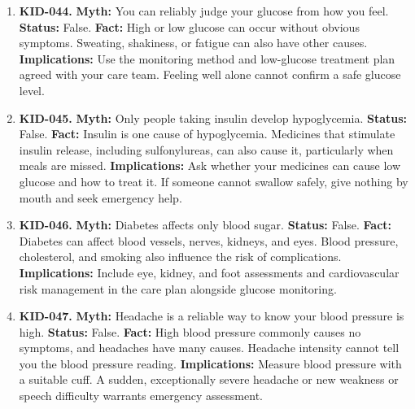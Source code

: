 \documentclass[11pt,oneside]{book}
\begin{document}
\begin{enumerate}[leftmargin=0pt,labelwidth=0pt,labelsep=0pt,itemindent=0pt]
\textbf{Implications:} Discuss medication changes with your clinician. Continued glucose and complication monitoring is recommended even in remission.
\item[] \textbf{KID-044.} \textbf{Myth:} You can reliably judge your glucose from how you feel.\newline
\textbf{Status:} False.\newline
\textbf{Fact:} High or low glucose can occur without obvious symptoms. Sweating, shakiness, or fatigue can also have other causes. \cite{ref359}\newline
\textbf{Implications:} Use the monitoring method and low-glucose treatment plan agreed with your care team. Feeling well alone cannot confirm a safe glucose level.
\item[] \textbf{KID-045.} \textbf{Myth:} Only people taking insulin develop hypoglycemia.\newline
\textbf{Status:} False.\newline
\textbf{Fact:} Insulin is one cause of hypoglycemia. Medicines that stimulate insulin release, including sulfonylureas, can also cause it, particularly when meals are missed. \cite{ref359}\newline
\textbf{Implications:} Ask whether your medicines can cause low glucose and how to treat it. If someone cannot swallow safely, give nothing by mouth and seek emergency help.
\item[] \textbf{KID-046.} \textbf{Myth:} Diabetes affects only blood sugar.\newline
\textbf{Status:} False.\newline
\textbf{Fact:} Diabetes can affect blood vessels, nerves, kidneys, and eyes. Blood pressure, cholesterol, and smoking also influence the risk of complications. \cite{ref271}\newline
\textbf{Implications:} Include eye, kidney, and foot assessments and cardiovascular risk management in the care plan alongside glucose monitoring.
\item[] \textbf{KID-047.} \textbf{Myth:} Headache is a reliable way to know your blood pressure is high.\newline
\textbf{Status:} False.\newline
\textbf{Fact:} High blood pressure commonly causes no symptoms, and headaches have many causes. Headache intensity cannot tell you the blood pressure reading. \cite{ref360}\newline
\textbf{Implications:} Measure blood pressure with a suitable cuff. A sudden, exceptionally severe headache or new weakness or speech difficulty warrants emergency assessment.

\end{enumerate}
\end{document}
